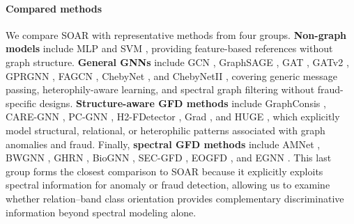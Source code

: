 \documentclass[10pt,journal]{IEEEtran}
\begin{document}
\paragraph{Compared methods}
We compare SOAR with representative methods from four groups.
\textbf{Non-graph models} include MLP \cite{rumelhart1986learning} and
SVM \cite{cortes1995support}, providing feature-based references without
graph structure.
\textbf{General GNNs} include GCN \cite{kipf2017gcn},
GraphSAGE \cite{hamilton2017graphsage},
GAT \cite{velickovic2018gat},
GATv2 \cite{brody2022gatv2},
GPRGNN \cite{chien2021gprgnn},
FAGCN \cite{bo2021fagcn},
ChebyNet \cite{defferrard2016chebnet}, and
ChebyNetII \cite{he2022chebnetii}, covering generic message passing,
heterophily-aware learning, and spectral graph filtering without
fraud-specific designs.
\textbf{Structure-aware GFD methods} include
GraphConsis \cite{liu2020graphconsis},
CARE-GNN \cite{dou2020caregnn},
PC-GNN \cite{liu2021pcgnn},
H2-FDetector \cite{shi2022h2fdetector},
Grad \cite{yang2025grad}, and
HUGE \cite{pan2025huge}, which explicitly model structural, relational, or
heterophilic patterns associated with graph anomalies and fraud.
Finally, \textbf{spectral GFD methods} include
AMNet \cite{chai2022amnet},
BWGNN \cite{tang2022bwgnn},
GHRN \cite{gao2023ghrn},
BioGNN \cite{gao2024biognn},
SEC-GFD \cite{xu2024secgfd},
EOGFD \cite{wang2026eogfd}, and
EGNN \cite{liu2026egnn}.
This last group forms the closest comparison to SOAR because it explicitly
exploits spectral information for anomaly or fraud detection, allowing us to
examine whether relation--band class orientation provides complementary
discriminative information beyond spectral modeling alone.
\end{document}
